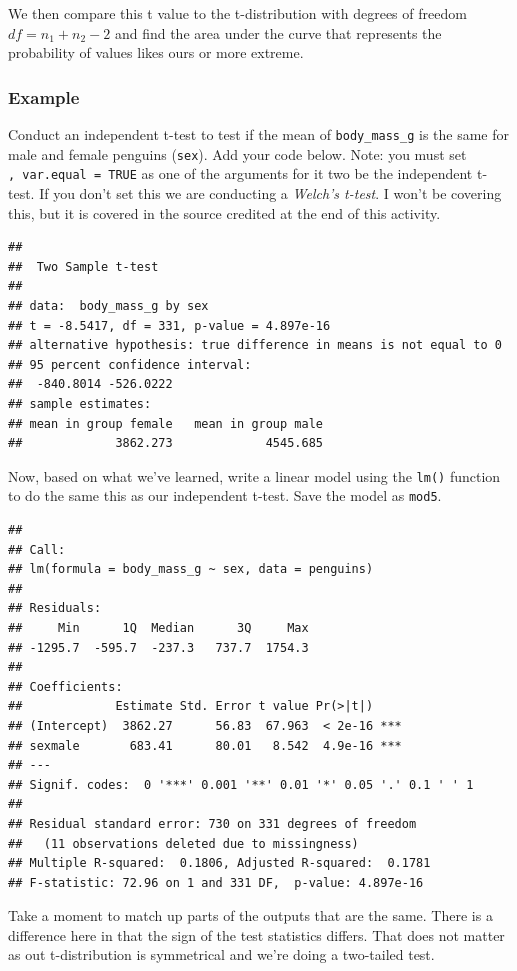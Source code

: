 \documentclass[
  openany]{book}
\begin{document}
We then compare this t value to the t-distribution with degrees of freedom \(df = n_1 + n_2 - 2\) and find the area under the curve that represents the probability of values likes ours or more extreme.

\hypertarget{example-1}{%
\subsubsection{Example}\label{example-1}}

Conduct an independent t-test to test if the mean of \texttt{body\_mass\_g} is the same for male and female penguins (\texttt{sex}). Add your code below. Note: you must set \texttt{,\ var.equal\ =\ TRUE} as one of the arguments for it two be the independent t-test. If you don't set this we are conducting a \emph{Welch's t-test}. I won't be covering this, but it is covered in the source credited at the end of this activity.

\begin{verbatim}
## 
##  Two Sample t-test
## 
## data:  body_mass_g by sex
## t = -8.5417, df = 331, p-value = 4.897e-16
## alternative hypothesis: true difference in means is not equal to 0
## 95 percent confidence interval:
##  -840.8014 -526.0222
## sample estimates:
## mean in group female   mean in group male 
##             3862.273             4545.685
\end{verbatim}

Now, based on what we've learned, write a linear model using the \texttt{lm()} function to do the same this as our independent t-test. Save the model as \texttt{mod5}.

\begin{verbatim}
## 
## Call:
## lm(formula = body_mass_g ~ sex, data = penguins)
## 
## Residuals:
##     Min      1Q  Median      3Q     Max 
## -1295.7  -595.7  -237.3   737.7  1754.3 
## 
## Coefficients:
##             Estimate Std. Error t value Pr(>|t|)    
## (Intercept)  3862.27      56.83  67.963  < 2e-16 ***
## sexmale       683.41      80.01   8.542  4.9e-16 ***
## ---
## Signif. codes:  0 '***' 0.001 '**' 0.01 '*' 0.05 '.' 0.1 ' ' 1
## 
## Residual standard error: 730 on 331 degrees of freedom
##   (11 observations deleted due to missingness)
## Multiple R-squared:  0.1806, Adjusted R-squared:  0.1781 
## F-statistic: 72.96 on 1 and 331 DF,  p-value: 4.897e-16
\end{verbatim}

Take a moment to match up parts of the outputs that are the same. There is a difference here in that the sign of the test statistics differs. That does not matter as out t-distribution is symmetrical and we're doing a two-tailed test.
\end{document}
